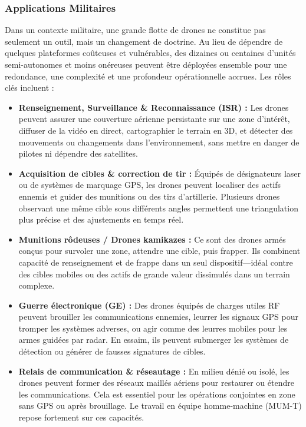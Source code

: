 \documentclass[a4paper,12pt]{article}
\begin{document}
\subsubsection*{Applications Militaires}

Dans un contexte militaire, une grande flotte de drones ne constitue pas seulement un outil, mais un changement de doctrine. Au lieu de dépendre de quelques plateformes coûteuses et vulnérables, des dizaines ou centaines d’unités semi-autonomes et moins onéreuses peuvent être déployées ensemble pour une redondance, une complexité et une profondeur opérationnelle accrues. Les rôles clés incluent :

\begin{itemize}
    \item \textbf{Renseignement, Surveillance \& Reconnaissance (ISR) :}  
    Les drones peuvent assurer une couverture aérienne persistante sur une zone d’intérêt, diffuser de la vidéo en direct, cartographier le terrain en 3D, et détecter des mouvements ou changements dans l’environnement, sans mettre en danger de pilotes ni dépendre des satellites.

    \item \textbf{Acquisition de cibles \& correction de tir :}  
    Équipés de désignateurs laser ou de systèmes de marquage GPS, les drones peuvent localiser des actifs ennemis et guider des munitions ou des tirs d’artillerie. Plusieurs drones observant une même cible sous différents angles permettent une triangulation plus précise et des ajustements en temps réel.

    \item \textbf{Munitions rôdeuses / Drones kamikazes :}  
    Ce sont des drones armés conçus pour survoler une zone, attendre une cible, puis frapper. Ils combinent capacité de renseignement et de frappe dans un seul dispositif—idéal contre des cibles mobiles ou des actifs de grande valeur dissimulés dans un terrain complexe.

    \item \textbf{Guerre électronique (GE) :}  
    Des drones équipés de charges utiles RF peuvent brouiller les communications ennemies, leurrer les signaux GPS pour tromper les systèmes adverses, ou agir comme des leurres mobiles pour les armes guidées par radar. En essaim, ils peuvent submerger les systèmes de détection ou générer de fausses signatures de cibles.

    \item \textbf{Relais de communication \& réseautage :}  
    En milieu dénié ou isolé, les drones peuvent former des réseaux maillés aériens pour restaurer ou étendre les communications. Cela est essentiel pour les opérations conjointes en zone sans GPS ou après brouillage. Le travail en équipe homme-machine (MUM-T) repose fortement sur ces capacités.


\end{itemize}
\end{document}
